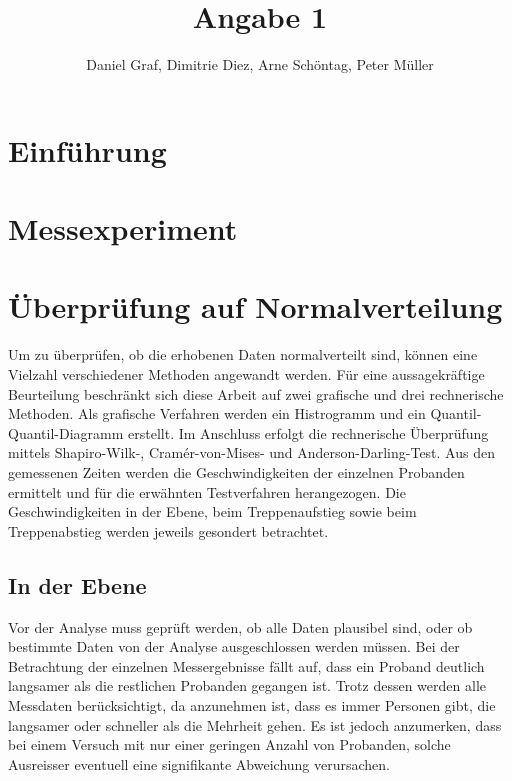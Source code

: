 
 
\title{Angabe 1}
\providecommand{\subtitle}[1]{}
\subtitle{Untertitel}
\author{Daniel Graf, Dimitrie Diez, Arne Schöntag, Peter Müller}
\date{}


\maketitle


\tableofcontents

\section{Einführung}


\section{Messexperiment}
\section{Überprüfung auf Normalverteilung}
Um zu überprüfen, ob die erhobenen Daten normalverteilt sind, können eine Vielzahl verschiedener Methoden angewandt werden. Für eine aussagekräftige Beurteilung beschränkt sich diese Arbeit auf zwei grafische und drei rechnerische Methoden. Als grafische Verfahren werden ein Histrogramm und ein Quantil-Quantil-Diagramm erstellt. Im Anschluss erfolgt die rechnerische Überprüfung mittels Shapiro-Wilk-, Cramér-von-Mises- und Anderson-Darling-Test. Aus den gemessenen Zeiten werden die Geschwindigkeiten der einzelnen Probanden ermittelt und für die erwähnten Testverfahren herangezogen. Die Geschwindigkeiten in der Ebene, beim Treppenaufstieg sowie beim Treppenabstieg werden jeweils gesondert betrachtet.

\subsection{In der Ebene}
Vor der Analyse muss geprüft werden, ob alle Daten plausibel sind, oder ob bestimmte Daten von der Analyse ausgeschlossen werden müssen. Bei der Betrachtung der einzelnen Messergebnisse fällt auf, dass ein Proband deutlich langsamer als die restlichen Probanden gegangen ist. Trotz dessen werden alle Messdaten berücksichtigt, da anzunehmen ist, dass es immer Personen gibt, die langsamer oder schneller als die Mehrheit gehen. Es ist jedoch anzumerken, dass bei einem Versuch mit nur einer geringen Anzahl von Probanden, solche Ausreisser eventuell eine signifikante Abweichung verursachen.


